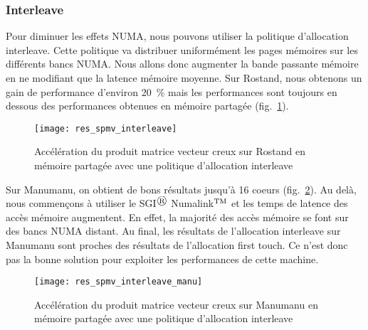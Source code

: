\subsubsection{Interleave}
Pour diminuer les effets NUMA, nous pouvons utiliser la politique d'allocation interleave.
%
Cette politique va distribuer uniformément les pages mémoires sur les différents bancs NUMA.
%
Nous allons donc augmenter la bande passante mémoire en ne modifiant que la latence mémoire moyenne.
%
Sur Rostand, nous obtenons un gain de performance d'environ 20~\% mais les performances sont toujours en dessous des performances obtenues en mémoire partagée (fig.~\ref{fig:res_spmv_interleave_rostand}).

\begin{figure}[t!]
  \centering
  \texttt{[image: res\_spmv\_interleave]}
  \caption{Accélération du produit matrice vecteur creux sur Rostand en mémoire partagée avec une politique d'allocation interleave}
  \label{fig:res_spmv_interleave_rostand}
\end{figure}

Sur Manumanu, on obtient de bons résultats jusqu'à 16 coeurs (fig.~\ref{fig:res_spmv_interleave_manumanu}).
%
Au delà, nous commençons à utiliser le SGI$^\registered$ Numalink$^{\rm TM}$ et les temps de latence des accès mémoire augmentent.
%
En effet, la majorité des accès mémoire se font sur des bancs NUMA distant.
%
Au final, les résultats de l'allocation interleave sur Manumanu sont proches des résultats de l'allocation first touch.
%
Ce n'est donc pas la bonne solution pour exploiter les performances de cette machine.

\begin{figure}[t!]
  \centering
  \texttt{[image: res\_spmv\_interleave\_manu]}
  \caption{Accélération du produit matrice vecteur creux sur Manumanu en mémoire partagée avec une politique d'allocation interleave}
  \label{fig:res_spmv_interleave_manumanu}
\end{figure}
